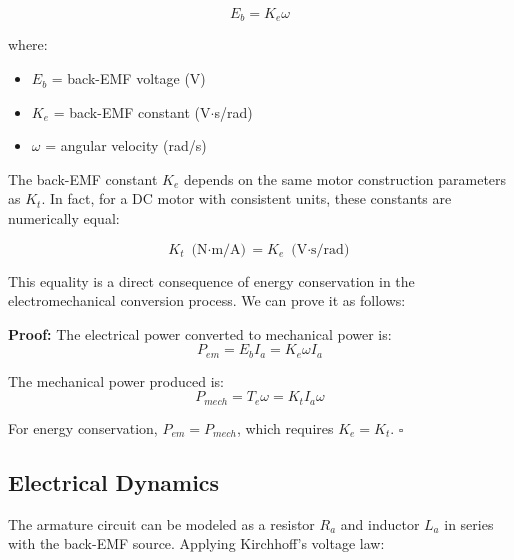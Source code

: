 \begin{equation}
    \boxed{E_b = K_e \omega}
    \label{eq:back_emf}
\end{equation}

where:
\begin{itemize}
    \item $E_b$ = back-EMF voltage (V)
    \item $K_e$ = back-EMF constant (V$\cdot$s/rad)
    \item $\omega$ = angular velocity (rad/s)
\end{itemize}

The back-EMF constant $K_e$ depends on the same motor construction parameters as $K_t$. In fact, for a DC motor with consistent units, these constants are numerically equal:

\begin{equation}
    \boxed{K_t \text{ (N$\cdot$m/A)} = K_e \text{ (V$\cdot$s/rad)}}
    \label{eq:kt_ke_equality}
\end{equation}

This equality is a direct consequence of energy conservation in the electromechanical conversion process. We can prove it as follows:

\textbf{Proof:} The electrical power converted to mechanical power is:
\begin{equation}
    P_{em} = E_b I_a = K_e \omega I_a
\end{equation}

The mechanical power produced is:
\begin{equation}
    P_{mech} = T_e \omega = K_t I_a \omega
\end{equation}

For energy conservation, $P_{em} = P_{mech}$, which requires $K_e = K_t$. $\square$


\subsection{Electrical Dynamics}

The armature circuit can be modeled as a resistor $R_a$ and inductor $L_a$ in series with the back-EMF source. Applying Kirchhoff's voltage law:

